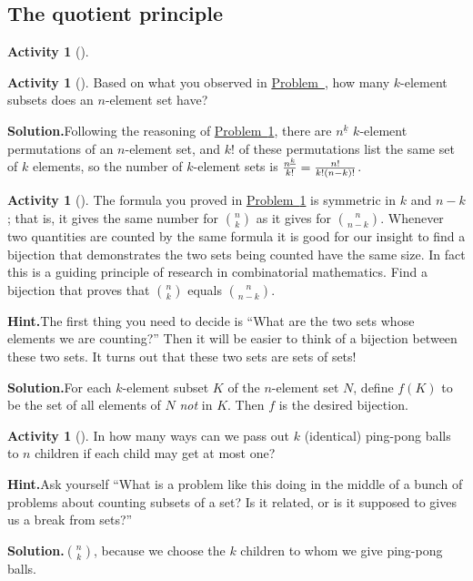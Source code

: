 \documentclass[10pt,]{book}
\theoremstyle{plain}
\theoremstyle{definition}
\newtheorem{activity}[project]{Activity}
\numberwithin{equation}{chapter}
\begin{document}
\subsection[{The quotient principle}]{The quotient principle}\label{subsection-6}
\begin{activity}[]\label{twelvechoosethree}
\end{activity}
\begin{activity}[]\label{nchoosek}
Based on what you observed in \hyperref[twelvechoosethreefinal]{Problem~}, how many \(k\)-element subsets does an \(n\)-element set have?%
\par\medskip\noindent%
\textbf{Solution.}\quad Following the reasoning of \hyperref[twelvechoosethree]{Problem~\ref{twelvechoosethree}}, there are \(n^{\underline{k}}\) \(k\)-element permutations of an \(n\)-element set, and \(k!\) of these permutations list the same set of \(k\) elements, so the number of \(k\)-element sets is \({n^{\underline{k}}\over k!}= {n!\over k!(n-k)!}\).%
\end{activity}
\begin{activity}[]\label{activity-36}
The formula you proved in \hyperref[nchoosek]{Problem~\ref{nchoosek}} is symmetric in \(k\) and \(n-k\); that is, it gives the same number for \(n\choose k\) as it gives for \(n\choose n-k\). Whenever two quantities are counted by the same formula it is good for our insight to find a bijection that demonstrates the two sets being counted have the same size. In fact this is a guiding principle of research in combinatorial mathematics. Find a bijection that proves that \(n\choose k\) equals \(n\choose n-k\).%
\par\medskip\noindent%
\textbf{Hint.}\quad The first thing you need to decide is “What are the two sets whose elements we are counting?” Then it will be easier to think of a bijection between these two sets. It turns out that these two sets are sets of sets!\par\medskip\noindent%
\textbf{Solution.}\quad For each \(k\)-element subset \(K\) of the \(n\)-element set \(N\), define \(f(K)\) to be the set of all elements of \(N\) \emph{not} in \(K\). Then \(f\) is the desired bijection.%
\end{activity}
\begin{activity}[]\label{ping-pong}
In how many ways can we pass out \(k\) (identical) ping-pong balls to \(n\) children if each child may get at most one?%
\par\medskip\noindent%
\textbf{Hint.}\quad Ask yourself “What is a problem like this doing in the middle of a bunch of problems about counting subsets of a set? Is it related, or is it supposed to gives us a break from sets?”\par\medskip\noindent%
\textbf{Solution.}\quad \(n\choose k\), because we choose the \(k\) children to whom we give ping-pong balls.%
\end{activity}
\end{document}
